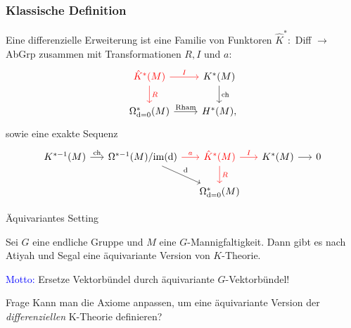 \documentclass[12pt,utf8,notheorems,compress,t]{beamer}
\renewcommand{\_}{\mathpunct{.}}
\newcommand{\?}{\,{:}\,}
\newcommand{\dd}{\textup{d}}
\begin{document}
\begin{frame}\frametitle{Klassische Definition}
    Eine differenzielle Erweiterung ist eine Familie von Funktoren $\hat
    K^*\colon$ Diff $\rightarrow$ AbGrp zusammen mit Transformationen $R, I$ und
    $a$:
\begin{equation}\begin{tikzcd}[ampersand replacement=\&]
        \textcolor{red}{\hat K^*(M)} \arrow[d,
        "R", red]\arrow[r, "I", red] \& K^*(M)\arrow[d, "\mathrm{ch}"] \\ 
        \Omega^*_{\dd=0}(M) \arrow[r, "\mathrm{Rham}"]\& H^*(M),
\end{tikzcd}\nonumber
\end{equation} \vspace{1em} sowie eine exakte Sequenz\vspace{-2em}
\begin{equation}\begin{tikzcd}[ampersand replacement=\&]
        K^{*-1}(M)\arrow[r, "\mathrm{ch}"]\&[-10pt]\Omega^{*-1}(M) /
        \mathrm{im}(\dd)\ar[dr, "\dd"]\arrow[r, "a", red] \&[-10pt]
        \textcolor{red}{\hat K^*(M)} \arrow[r, "I", red]\ar[d, "R", red]
        \&[-10pt] K^*(M) \arrow[r] \&[-10pt]  0 \\ \&\& \Omega^*_{\dd=0}(M)\&\&
\end{tikzcd}\nonumber
\end{equation}
\end{frame}
\begin{frame}{Äquivariantes Setting}

    Sei $G$ eine endliche Gruppe und $M$ eine $G$-Mannigfaltigkeit. Dann gibt es
    nach Atiyah und Segal eine äquivariante Version von $K$-Theorie.
    
    \textcolor{blue}{Motto:} Ersetze Vektorbündel durch äquivariante
    $G$-Vektorbündel!
    \vspace{1em}
    \begin{block}{Frage}
        Kann man die Axiome anpassen, um eine äquivariante Version der 
        \emph{differenziellen} K-Theorie definieren?
    \end{block}
\end{frame}
\end{document}
